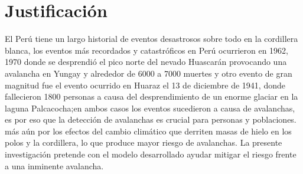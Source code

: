 \documentclass[a4paper,11pt]{report}
\begin{document}

\section{Justificación}
El Perú tiene un largo historial de eventos desastrosos sobre todo en la cordillera blanca, los eventos más recordados y  catastróficos en  Perú ocurrieron en 1962, 1970 donde se desprendió el pico norte del nevado Huascarán provocando una avalancha en Yungay y alrededor de 6000 a 7000 muertes \cite{Evans2009} y otro evento de gran magnitud fue el evento ocurrido en Huaraz el 13 de diciembre de 1941, donde fallecieron 1800 personas \cite{WegnerSteven2014} a causa del desprendimiento de un enorme glaciar en la laguna Palcacocha;en ambos casos los eventos sucedieron a causa de avalanchas, es por eso que la detección de avalanchas es crucial para personas y poblaciones. más aún por los efectos del cambio climático que derriten masas de hielo en los polos y la cordillera, lo que produce mayor riesgo de avalanchas.
La presente investigación pretende con el modelo desarrollado ayudar   mitigar el riesgo frente a una inminente avalancha.
\end{document}
